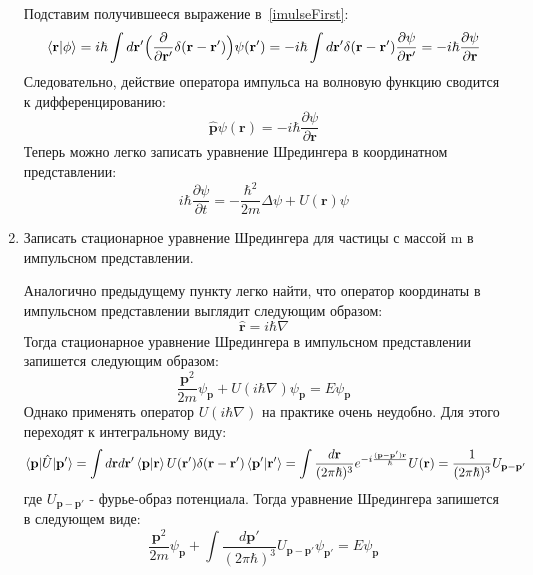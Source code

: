 \documentclass{article}
\begin{document}
\begin{enumerate}
	Подставим получившееся выражение в~\eqref{imulseFirst}:
	\begin{equation}
		\braket{\textbf{r}|\phi} = i\hbar \int d\textbf{r}' \Big(\frac{\partial}{\partial \textbf{r}'} \delta(\textbf{r} - \textbf{r}')\Big) \psi(\textbf{r}') = - i\hbar \int d\textbf{r}' \delta(\textbf{r} - \textbf{r}') \frac{\partial \psi}{\partial \textbf{r}'} = - i\hbar \frac{\partial \psi}{\partial \textbf{r}}
	\end{equation}
	Следовательно, действие оператора импульса на волновую функцию сводится к дифференцированию:
	\begin{equation}
		\hat{\textbf{p}}\psi(\textbf{r}) = -i\hbar \frac{\partial \psi}{\partial \textbf{r}}
	\end{equation}
	Теперь можно легко записать уравнение Шредингера в координатном представлении:
	\begin{equation}
		i\hbar \frac{\partial \psi}{\partial t} = -\frac{\hbar^2}{2m} \Delta \psi + U(\textbf{r})\psi
	\end{equation}
	
	\item {Записать стационарное уравнение Шредингера для частицы с массой m в импульсном представлении.}
	
	Аналогично предыдущему пункту легко найти, что оператор координаты в импульсном представлении выглядит следующим образом:
	\begin{equation}
		\hat{\textbf{r}} = i\hbar \nabla
	\end{equation}
	Тогда стационарное уравнение Шредингера в импульсном представлении запишется следующим образом:
	\begin{equation}
		\frac{\textbf{p}^2}{2m} \psi_\textbf{p} + U(i\hbar\nabla)\psi_\textbf{p} = E \psi_\textbf{p}
	\end{equation}
	Однако применять оператор $U(i\hbar\nabla)$ на практике очень неудобно. Для этого переходят к интегральному виду:
	\begin{equation}
		\braket{\textbf{p}|\hat{U}|\textbf{p}'} = \int d\textbf{r} d\textbf{r}' \braket{\textbf{p}|\textbf{r}} U(\textbf{r}')\delta(\textbf{r}-\textbf{r}')\braket{\textbf{p}'|\textbf{r}'} = \int \frac{d\textbf{r}}{(2\pi\hbar)^3} e^{-i\frac{(\textbf{p}-\textbf{p}')\textbf{r}}{\hbar}} U(\textbf{r}) = \frac{1}{(2\pi\hbar)^3}U_{\textbf{p}-\textbf{p}'}
	\end{equation}
	где $U_{\textbf{p}-\textbf{p}'}$ - фурье-образ потенциала. Тогда уравнение Шредингера запишется в следующем виде:
	\begin{equation}
		\frac{\textbf{p}^2}{2m} \psi_\textbf{p} + \int \frac{d\textbf{p}'}{(2\pi\hbar)^3} U_{\textbf{p}-\textbf{p}'}\psi_{\textbf{p}'} = E \psi_\textbf{p}
	\end{equation}
\end{enumerate}
\end{document}
